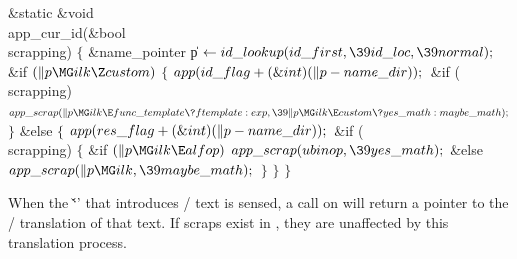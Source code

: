\B\1\1\&{static} \&{void} \\{app\_cur\_id}(\&{bool} \\{scrapping})\2\2\6
${}\{{}$\1\6
\&{name\_pointer} \|p${}\K\\{id\_lookup}(\\{id\_first},\39\\{id\_loc},\39%
\\{normal});{}$\7
\&{if} ${}(\|p\MG\\{ilk}\Z\\{custom}){}$\5
${}\{{}$\1\6
${}\\{app}(\\{id\_flag}+(\&{int})(\|p-\\{name\_dir}));{}$\6
\&{if} (\\{scrapping})\1\5
${}\\{app\_scrap}(\|p\MG\\{ilk}\E\\{func\_template}\?\\{ftemplate}:\\{exp},\39%
\|p\MG\\{ilk}\E\\{custom}\?\\{yes\_math}:\\{maybe\_math});{}$\2\6
\4${}\}{}$\2\6
\&{else}\5
${}\{{}$\1\6
${}\\{app}(\\{res\_flag}+(\&{int})(\|p-\\{name\_dir}));{}$\6
\&{if} (\\{scrapping})\5
${}\{{}$\1\6
\&{if} ${}(\|p\MG\\{ilk}\E\\{alfop}){}$\1\5
${}\\{app\_scrap}(\\{ubinop},\39\\{yes\_math})\hbox{;}{}$\2\6
\&{else}\1\5
${}\\{app\_scrap}(\|p\MG\\{ilk},\39\\{maybe\_math});{}$\2\6
\4${}\}{}$\2\6
\4${}\}{}$\2\6
\4${}\}{}$\2\par
\fi

When the `\.{\v}' that introduces \CEE/ text is sensed, a call on
 will return a pointer to the \TEX/ translation of
that text. If scraps exist in , they are
unaffected by this translation process.

